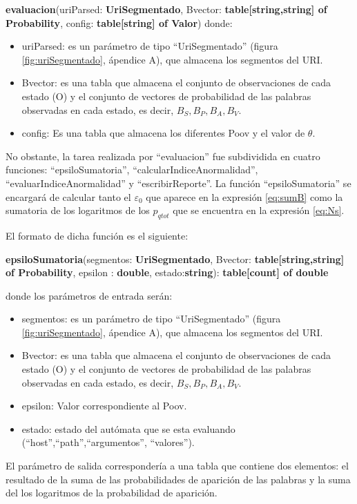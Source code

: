 \textbf{evaluacion}(uriParsed: \textbf{UriSegmentado}, Bvector: \textbf{table[string,string]
of Probability}, config: \textbf{table[string] of Valor})
donde:
\begin{itemize}
\item uriParsed: es un parámetro de tipo ``UriSegmentado'' (figura \ref{fig:uriSegmentado}, ápendice A), que
almacena los segmentos del URI.
\item Bvector: es una tabla que almacena el conjunto de observaciones de cada estado (O) y el conjunto de vectores de probabilidad de las palabras observadas en cada estado, es decir, $B_{S}, B_{P}, B_{A}, B_{V}$.
\item config: Es una tabla que almacena los diferentes Poov y el valor de $\theta$.
\end{itemize}

No obstante, la tarea realizada por ``evaluacion'' fue subdividida en cuatro funciones: ``epsiloSumatoria'', ``calcularIndiceAnormalidad'',
``evaluarIndiceAnormalidad'' y ``escribirReporte''. La función ``epsiloSumatoria'' se encargará de calcular tanto el $\varepsilon_{0}$ que aparece en la expresión \ref{eq:sumB}
como la sumatoria de los logaritmos de los $p_{qtot}$ que se encuentra en la
expresión \ref{eq:Ns}.

El formato de dicha función es el siguiente:

\textbf{epsiloSumatoria}(segmentos: \textbf{UriSegmentado},
Bvector: \textbf{table[string,string] of Probability}, epsilon : \textbf{double}, estado:\textbf{string}):
\textbf{table[count] of double}

donde los parámetros de entrada serán:
\begin{itemize}
\item segmentos: es un parámetro de tipo ``UriSegmentado'' (figura \ref{fig:uriSegmentado}, ápendice A), que
almacena los segmentos del URI.
\item Bvector: es una tabla que almacena el conjunto de observaciones de cada estado (O) y el conjunto de vectores de probabilidad de las palabras observadas en cada estado, es decir, $B_{S}, B_{P}, B_{A}, B_{V}$.
\item epsilon: Valor correspondiente al Poov.
\item estado: estado del autómata que se esta evaluando (``host'',``path'',``argumentos'',
``valores'').
\end{itemize}

El parámetro de salida correspondería a una tabla que contiene dos elementos: el resultado de la suma de las probabilidades de aparición de las
palabras y la suma del los logaritmos de la probabilidad de aparición.

